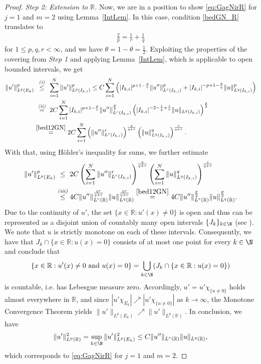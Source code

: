 \documentclass{article}
\newcommand{\eni}{\textit{(i)}}
\newcommand{\enii}{\textit{(ii)}}
\newcommand{\eniii}{\textit{(iii)}}
\numberwithin{figure}{section}
\newcommand{\R}{\mathbb{R}}
\numberwithin{equation}{section}
\begin{document}
\begin{proof}
\textit{Step 2: Extension to $\R$.} Now, we are in a position to show \eqref{eq:GagNirR} for $j=1$ and $m=2$ using Lemma~\ref{IntLem}. In this case, condition \eqref{bedGN_R} translates to
\begin{align} \label{bed12GN}
   \frac 2p = \frac 1r + \frac 1q
\end{align}
for $1 \leq p,q,r < \infty$, and we have $\theta=1-\theta=\frac12$. Exploiting the properties of the covering from \textit{Step 1} and applying Lemma~\ref{IntLem}, which is applicable to open bounded intervals, we get
\begin{align}
  \|u'\|_{L^p(E_k)}^p & \overset{\ \,\eni\,\ }{\leq} \sum_{i=1}^N \|u'\|_{L^p(I_{k,i})}^p 
  \leq C \sum_{i=1}^N \left( |I_{k,i}|^{p+1 - \frac pr}\|u''\|_{L^r(I_{k,i})}^p + |I_{k,i}|^{-p+ 1 - \frac pq}\|u\|_{L^q(I_{k,i})}^p\right) \\
  & \overset{\ \enii\ }{=} 2 C \sum_{i=1}^N |I_{k,i}|^{p+1 - \frac pr}\|u''\|_{L^r(I_{k,i})}^{\frac p2} \left( |I_{k,i}|^{-2 -\frac 1q + \frac 1r}\|u\|_{L^q(I_{k,i})} \right)^{\frac p2} \\
  & \overset{\eqref{bed12GN}}{=} 2 C \sum_{i=1}^N \left( \|u''\|_{L^r(I_{k,i})}^r \right)^{\frac{q}{q+r}} \left( \|u\|_{L^q(I_{k,i})}^q \right)^{\frac{r}{q+r}}.
\end{align}
With that, using Hölder's inequality for sums, we further estimate
\begin{align}
  \|u'\|_{L^p(E_k)}^p
  & \overset{\hphantom{\eniii}}{\leq} 2 C \left( \sum_{i=1}^N \|u''\|_{L^r(I_{k,i})}^r \right)^{\frac{q}{q+r}} \left(\sum_{i=1}^N \|u\|_{L^q(I_{k,i})}^q \right)^{\frac{r}{q+r}} \\
  & \overset{\eniii}{\leq} 4 C \|u''\|_{L^r(\R)}^{\frac{qr}{q+r}} \|u\|_{L^q(\R)}^{\frac{qr}{q+r}}
  \overset{\eqref{bed12GN}}{=} 4 C \|u''\|_{L^r(\R)}^{\frac p2} \|u\|_{L^q(\R)}^{\frac p2}.
\end{align}
 Due to the continuity of $u'$, the set $\{x \in \R: u'(x) \neq 0\}$ is open and thus can be represented as a disjoint union of countably many open intervals $\{J_k\}_{k \in \N}$ (see \cite[Chapter~1, Proposition~9]{Roy}). We note that $u$ is strictly monotone on each of these intervals. Consequently, we have that $J_k \cap \{x \in \R: u(x)=0\}$ consists of at most one point for every $k \in \N$ and conclude that 
\begin{align}
    \{x \in \R: u'(x)\neq0 \text{ and } u(x)=0 \} = \bigcup_{k \in \N} (J_k \cap \{x \in \R: u(x)=0\})
\end{align} 
is countable, i.e. has Lebesgue measure zero. Accordingly, $u'=u' \chi_{\{u\neq0\}}$ holds almost everywhere in $\R$, and since $|u' \chi_{E_k}| \nearrow |u' \chi_{\{u\neq0\}}|$ as $k \to \infty$, the Monotone Convergence Theorem yields $\|u'\|_{L^p(E_k)} \nearrow \|u'\|_{L^p(\R)}$. In conclusion, we have
\begin{align} \label{eq:GagNir12}
    \|u'\|^2_{L^p(\R)} = \sup_{k \in \N} \|u'\|^2_{L^p(E_k)} \leq C \|u''\|_{L^r(\R)} \|u\|_{L^q(\R)},
\end{align}
which corresponds to \eqref{eq:GagNirR} for $j=1$ and $m=2$.


\end{proof}
\end{document}
